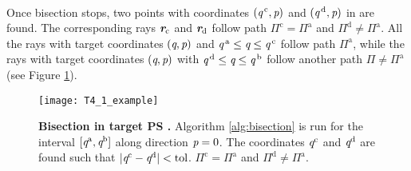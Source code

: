 \\ \indent Once bisection stops, two points with coordinates $(\textit{q}^{\,\textrm{c}}, \textit{p})$ and $(\textit{q}^{\,\textrm{d}}, \textit{p})$ in  are found. The corresponding rays $\textit{\textbf{r}}_{\textrm{c}}$ and $\textit{\textbf{r}}_{\textrm{d}}$ follow path $\Pi^{\textrm{c}}=\Pi^{\textrm{a}}$ and $\Pi^{\textrm{d}}\neq\Pi^{\textrm{a}}$. 
All the rays with target coordinates $(\textit{q}, \textit{p})$ and $\textit{q}^{\,\textrm{a}}\leq\textit{q}\leq\textit{q}^{\,\textrm{c}}$ follow path $\Pi^{\textrm{a}}$, while the rays with target coordinates $(\textit{q}, \textit{p})$ with $\textit{q}^{\,\textrm{d}}\leq\textit{q}\leq\textit{q}^{\,\textrm{b}}$ follow another path $\Pi \neq \Pi^{\textrm{a}}$ (see Figure \ref{fig:bisec}). 
\begin{figure}[h]
  \begin{center}
  \texttt{[image: T4\_1\_example]}
  \end{center}
  \caption{\textbf{Bisection in target PS .} Algorithm \ref{alg:bisection} is run for the interval $[\textit{q}^{\textrm{a}}, \textit{q}^{\textrm{b}}]$ along direction $\textit{p}=0$. The coordinates $\textit{q}^{\textrm{c}}$ and $\textit{q}^{\textrm{d}}$ are found such that 
$|\textit{q}^{\textrm{c}}-\textit{q}^{\textrm{d}}|<\textrm{tol}$. $\Pi^{\textrm{c}}= \Pi^{\textrm{a}}$ and $\Pi^{\textrm{d}}\neq \Pi^{\textrm{a}}$.}
\label{fig:bisec}
 \end{figure}
